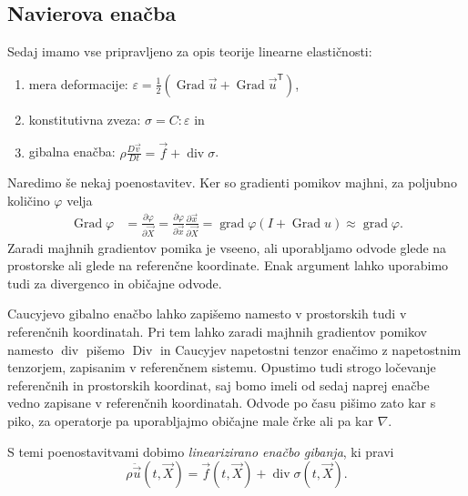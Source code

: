 \documentclass[a4paper,twoside]{article}
\theoremstyle{definition} %
\theoremstyle{plain} %
\numberwithin{equation}{section}
\newcommand{\T}{\mathsf{T}}
\renewcommand{\div}{\operatorname{div}}
\newcommand{\grad}{\operatorname{grad}}
\newcommand{\Div}{\operatorname{Div}}
\newcommand{\Grad}{\operatorname{Grad}}
\renewcommand{\phi}{\varphi}
\newcommand{\eps}{\varepsilon}
\newcommand{\dpar}[2]{\ensuremath{\frac{\partial #1}{\partial #2}}}
\newcommand{\DD}[2]{\ensuremath{\frac{D #1}{D #2}}}
\newcommand{\DDt}[1]{\DD{#1}{t}}
\newcommand{\vv}{\vec{v}}
\newcommand{\vu}{\vec{u}}
\newcommand{\vf}{\vec{f}}
\newcommand{\vX}{\vec{X}}
\newcommand{\vx}{\vec{x}}
\newcommand{\ts}{\sigma}
\begin{document}
\subsection{Navierova enačba}
Sedaj imamo vse pripravljeno za opis teorije linearne elastičnosti:
\begin{enumerate}[\indent 1)]
  \item mera deformacije: $\eps = \frac12(\Grad \vu + \Grad \vu^\T)$,
  \item konstitutivna zveza: $\ts = C : \eps$ in
  \item gibalna enačba: $\rho \DDt{\vv} = \vf + \div \ts$.
\end{enumerate}

Naredimo še nekaj poenostavitev. Ker so gradienti pomikov majhni,
za poljubno količino $\phi$ velja
\begin{align*}
  \Grad\phi &= \dpar{\phi}{\vX} = \dpar{\phi}{\vx} \dpar{\vx}{\vX} = \grad\phi
  (I + \Grad u) \approx \grad \phi.
\end{align*}
Zaradi majhnih gradientov pomika je vseeno, ali uporabljamo odvode glede na
prostorske ali glede na referenčne koordinate. Enak argument lahko uporabimo
tudi za divergenco in običajne odvode.

Caucyjevo gibalno enačbo lahko zapišemo namesto v prostorskih tudi v referenčnih
koordinatah. Pri tem lahko zaradi majhnih gradientov pomikov namesto $\div$
pišemo $\Div$ in Caucyjev napetostni tenzor enačimo z napetostnim tenzorjem,
zapisanim v referenčnem sistemu. Opustimo tudi strogo ločevanje referenčnih in
prostorskih koordinat, saj bomo imeli od sedaj naprej enačbe vedno zapisane v
referenčnih koordinatah. Odvode po času pišimo zato kar s piko, za operatorje pa
uporabljajmo običajne male črke ali pa kar $\nabla$.

S temi poenostavitvami dobimo \emph{linearizirano enačbo gibanja}, ki pravi
\begin{equation}
  \rho \ddot{\vu}(t, \vX) = \vf(t, \vX) + \div\sigma(t, \vX).
  \label{eq:gib-lin}
\end{equation}
\end{document}
